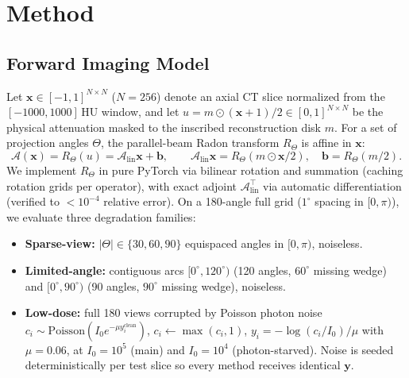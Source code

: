 \documentclass[11pt]{article}
\newcommand{\A}{\mathcal{A}}
\newcommand{\x}{\bm{x}}
\newcommand{\y}{\bm{y}}
\begin{document}
\section{Method}
\subsection{Forward Imaging Model}
Let $\x\in[-1,1]^{N\times N}$ ($N{=}256$) denote an axial CT slice normalized from the $[-1000,1000]$\,HU window, and let $u = m\odot(\x+1)/2 \in [0,1]^{N\times N}$ be the physical attenuation masked to the inscribed reconstruction disk $m$. For a set of projection angles $\Theta$, the parallel-beam Radon transform $R_\Theta$ is affine in $\x$:
\begin{equation}
  \A(\x) = R_\Theta(u) = \A_{\mathrm{lin}}\x + \bm{b},
  \qquad \A_{\mathrm{lin}}\x = R_\Theta(m\odot\x/2),
  \quad \bm{b} = R_\Theta(m/2).
\end{equation}
We implement $R_\Theta$ in pure PyTorch via bilinear rotation and summation (caching rotation grids per operator), with exact adjoint $\A_{\mathrm{lin}}^\top$ via automatic differentiation (verified to $<10^{-4}$ relative error). On a 180-angle full grid ($1^\circ$ spacing in $[0,\pi)$), we evaluate three degradation families:
\begin{itemize}[leftmargin=*,nosep]
  \item \textbf{Sparse-view:} $|\Theta|\in\{30,60,90\}$ equispaced angles in $[0,\pi)$, noiseless.
  \item \textbf{Limited-angle:} contiguous arcs $[0^\circ,120^\circ)$ (120 angles, $60^\circ$ missing wedge) and $[0^\circ,90^\circ)$ (90 angles, $90^\circ$ missing wedge), noiseless.
  \item \textbf{Low-dose:} full 180 views corrupted by Poisson photon noise $c_i\sim\mathrm{Poisson}(I_0 e^{-\mu y_i^{\mathrm{clean}}})$, $c_i\leftarrow\max(c_i,1)$, $y_i=-\log(c_i/I_0)/\mu$ with $\mu{=}0.06$, at $I_0{=}10^5$ (main) and $I_0{=}10^4$ (photon-starved). Noise is seeded deterministically per test slice so every method receives identical $\y$.
\end{itemize}
\end{document}
